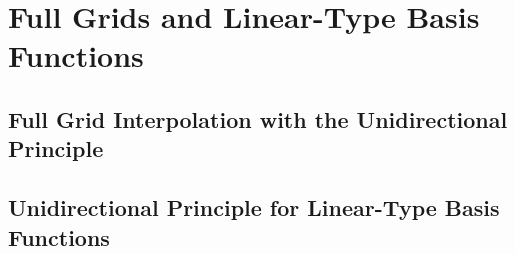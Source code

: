 \section{Full Grids and Linear-Type Basis Functions}

\blindtext{}

\subsection{Full Grid Interpolation with the Unidirectional Principle}

\blindtext{}

\subsection{Unidirectional Principle for Linear-Type Basis Functions}

\blindtext{}
